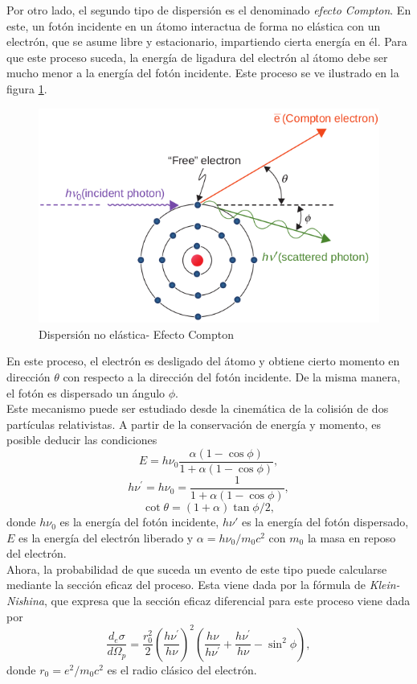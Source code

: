 Por otro lado, el segundo tipo de dispersión es el denominado \textit{efecto Compton}. En este, un fotón incidente en un átomo interactua de forma no elástica con un electrón, que se asume libre y estacionario, impartiendo cierta energía en él. Para que este proceso suceda, la energía de ligadura del electrón al átomo debe ser mucho menor a la energía del fotón incidente. Este proceso se ve ilustrado en la figura \ref{fig:compton}.\\
\begin{figure}[H]
	\centering
	\includegraphics[width=0.7\linewidth]{images/compton.png}
	\caption{Dispersión no elástica- Efecto Compton}
	\label{fig:compton}
\end{figure}
En este proceso, el electrón es desligado del átomo y obtiene cierto momento en dirección $\theta$ con respecto a la dirección del fotón incidente. De la misma manera, el fotón es dispersado un ángulo $\phi$. \\

Este mecanismo puede ser estudiado desde la cinemática de la colisión de dos partículas relativistas. A partir de la conservación de energía y momento, es posible deducir las condiciones 
\begin{equation}
E=h \nu_{0} \frac{\alpha(1-\cos \phi)}{1+\alpha(1-\cos \phi)},
\end{equation}
\begin{equation}
h \nu^{\prime}=h \nu_{0}=\frac{1}{1+\alpha(1-\cos \phi)},
\end{equation}
\begin{equation}
\cot \theta=(1+\alpha) \tan \phi / 2,
\end{equation}
donde $h\nu_0$ es la energía del fotón incidente, $h\nu'$ es la energía del fotón dispersado, $E$ es la energía del electrón liberado y $\alpha=h\nu_0/m_0c^2$ con $m_0$ la masa en reposo del electrón. \\

Ahora, la probabilidad de que suceda un evento de este tipo puede calcularse mediante la sección eficaz del proceso. Esta viene dada por la fórmula de \textit{Klein-Nishina}, que expresa que la sección eficaz diferencial para este proceso viene dada por
\begin{equation}
\label{eqn:KleinNishina}
\frac{d_{e} \sigma}{d \Omega_{p}}=\frac{r_{0}^{2}}{2}\left(\frac{h \nu^{\prime}}{h \nu}\right)^{2}\left(\frac{h \nu}{h \nu^{\prime}}+\frac{h \nu^{\prime}}{h \nu}-\sin ^{2} \phi\right),
\end{equation}
donde $r_0=e^2/m_0c^2$ es el radio clásico del electrón.\\

